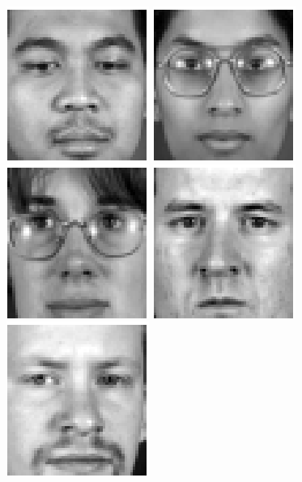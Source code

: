 \begin{figure}[ht]
\begin{center}
\includegraphics[scale=0.12]{ch4/figures/XM2VTS_26.png}
\includegraphics[scale=0.12]{ch4/figures/XM2VTS_27.png}
\includegraphics[scale=0.12]{ch4/figures/XM2VTS_28.png}
\includegraphics[scale=0.12]{ch4/figures/XM2VTS_29.png}
\includegraphics[scale=0.12]{ch4/figures/XM2VTS_30.png}

\end{center}
\end{figure}
